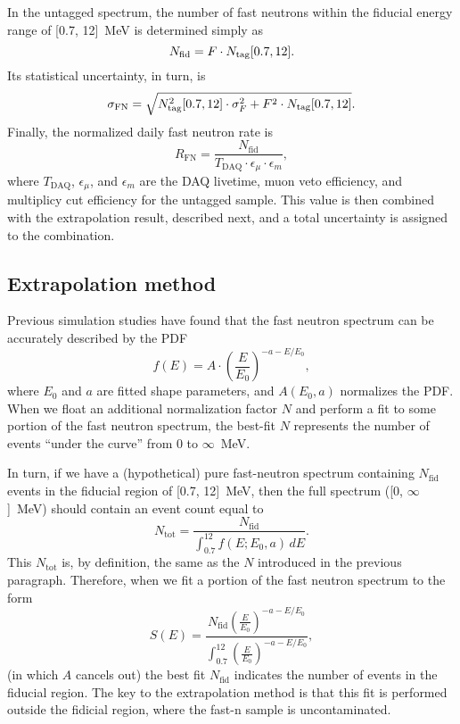 \documentclass[../thesis.tex]{subfiles}
\begin{document}
\def\nfn{\ensuremath{N_\mathrm{fid}}} \def\rfn{\ensuremath{R_\mathrm{FN}}}

In the untagged spectrum, the number of fast neutrons within the fiducial energy range of [0.7, 12]~MeV is determined simply as
\[ \nfn = F \cdot \ntag[0.7, 12]. \] Its statistical uncertainty, in turn, is
\begin{equation}
  \label{eq:fastn_scal_unc}
  \sigma_\mathrm{FN} = \sqrt{N_\mathrm{tag}^2[0.7, 12]
    \cdot \sigma_F^2 + F^2 \cdot N_\mathrm{tag}[0.7, 12]}.
\end{equation}
Finally, the normalized daily fast neutron rate is
\begin{equation}
  \label{eq:fastn_rate}
  \rfn = \frac{\nfn}{T_\mathrm{DAQ} \cdot \epsilon_\mu \cdot \epsilon_m},
\end{equation}
where $T_\mathrm{DAQ}$, $\epsilon_\mu$, and $\epsilon_m$ are the DAQ livetime, muon veto efficiency, and multiplicy cut efficiency for the untagged sample. This value is then combined with the extrapolation result, described next, and a total uncertainty is assigned to the combination.

\subsection{Extrapolation method}
\label{sec:fastn_extrap}

Previous simulation studies have found that the fast neutron spectrum can be accurately described by the PDF
\begin{equation}
  \label{eq:bkgFastnShape}
  f(E) = A \cdot \left( \frac{E}{E_0} \right)^{-a-E/E_0},  
\end{equation}
where $E_0$ and $a$ are fitted shape parameters, and $A(E_0, a)$ normalizes the PDF. When we float an additional normalization factor $N$ and perform a fit to some portion of the fast neutron spectrum, the best-fit $N$ represents the number of events ``under the curve'' from 0 to $\infty$~MeV.

In turn, if we have a (hypothetical) pure fast-neutron spectrum containing $N_\mathrm{fid}$ events in the fiducial region of [0.7, 12]~MeV, then the full spectrum ([0, $\infty$]~MeV) should contain an event count equal to
\[ N_\mathrm{tot} = \frac{N_\mathrm{fid}}{\int_{0.7}^{12} f(E; E_0, a)\,dE }. \] This $N_\mathrm{tot}$ is, by definition, the same as the $N$ introduced in the previous paragraph. Therefore, when we fit a portion of the fast neutron spectrum to the form
\begin{equation}
  \label{eq:fastn_extrap_form}
  S(E) = \frac{N_\mathrm{fid} \left( \frac{E}{E_0} \right)^{-a-E/E_0}}
  {\int_{0.7}^{12} \left( \frac{E}{E_0} \right)^{-a-E/E_0} },
\end{equation}
(in which $A$ cancels out) the best fit $N_\mathrm{fid}$ indicates the number of events in the fiducial region. The key to the extrapolation method is that this fit is performed outside the fidicial region, where the fast-n sample is uncontaminated.
\end{document}
